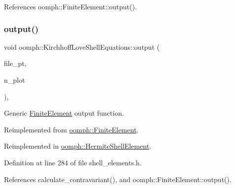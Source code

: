 References oomph\+::\+Finite\+Element\+::output().

\mbox{\label{classoomph_1_1KirchhoffLoveShellEquations_a27202721c38e55112bede54676946a27}} 
\subsubsection{\texorpdfstring{output()}{output()}\hspace{0.1cm}{\footnotesize\ttfamily [4/4]}}
{\footnotesize\ttfamily void oomph\+::\+Kirchhoff\+Love\+Shell\+Equations\+::output (\begin{DoxyParamCaption}\item[{F\+I\+LE $\ast$}]{file\+\_\+pt,  }\item[{const unsigned \&}]{n\+\_\+plot }\end{DoxyParamCaption})\hspace{0.3cm}{\ttfamily [inline]}, {\ttfamily [virtual]}}



Generic \hyperlink{classoomph_1_1FiniteElement}{Finite\+Element} output function. 



Reimplemented from \hyperlink{classoomph_1_1FiniteElement_adfaee690bb0608f03320eeb9d110d48c}{oomph\+::\+Finite\+Element}.



Reimplemented in \hyperlink{classoomph_1_1HermiteShellElement_a805a6e65b4dbb7bcffab6180ff9686ba}{oomph\+::\+Hermite\+Shell\+Element}.



Definition at line 284 of file shell\+\_\+elements.\+h.



References calculate\+\_\+contravariant(), and oomph\+::\+Finite\+Element\+::output().

\mbox{\label{classoomph_1_1KirchhoffLoveShellEquations_a5e088d691fff72ff1bce3e528d245018}} 
